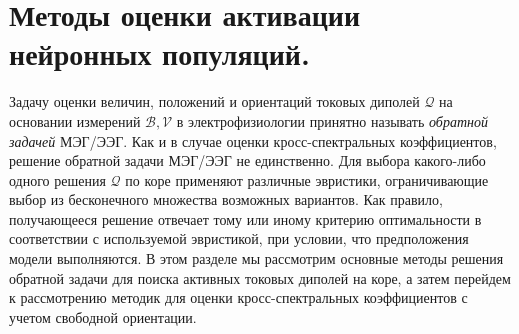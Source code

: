 \section{Методы оценки активации нейронных популяций.}\label{sec:inverse_problem}


Задачу оценки величин, положений и ориентаций токовых диполей $\mathcal{Q}$ на
основании измерений $\mathcal{B}, \mathcal{V}$ в электрофизиологии принятно
называть \emph{обратной задачей} МЭГ/ЭЭГ.  Как и в случае оценки
кросс-спектральных коэффициентов, решение обратной задачи МЭГ/ЭЭГ не
единственно.  Для выбора какого-либо одного решения $\mathcal{Q}$ по коре
применяют различные эвристики, ограничивающие выбор из бесконечного множества
возможных вариантов.  Как правило, получающееся решение отвечает тому или иному
критерию оптимальности в соответствии с используемой эвристикой, при условии,
что предположения модели выполняются.  В этом разделе мы рассмотрим
основные методы решения обратной задачи для поиска активных токовых диполей на
коре, а затем перейдем к рассмотрению методик для оценки кросс-спектральных
коэффициентов с учетом свободной ориентации.

